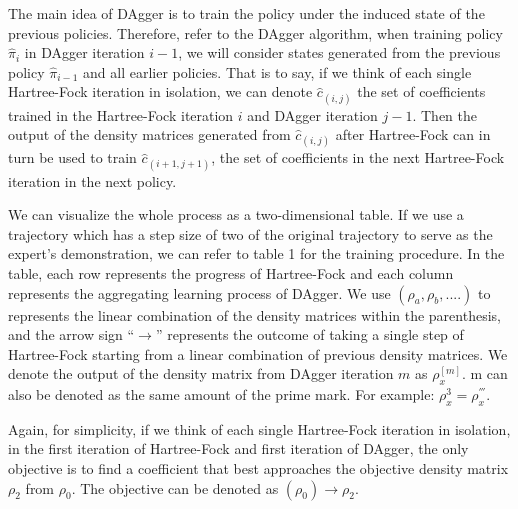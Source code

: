 \documentclass[twoside,11pt]{article}
\begin{document}


The main idea of DAgger is to train the policy under the induced state of the previous policies. Therefore, refer to the DAgger algorithm, when training policy $\hat{\pi}_{i}$ in DAgger iteration $i-1$,
we will consider states generated from the previous policy $\hat{\pi}_{i-1}$ and all earlier policies. That is to say, if we think of each single Hartree-Fock iteration in isolation, we can denote $\hat{c}_{(i,j)}$ the set of coefficients trained in the Hartree-Fock iteration $i$ and DAgger iteration $j-1$. Then the output of the density matrices generated from $\hat{c}_{(i,j)}$ after Hartree-Fock can in turn be used to train $\hat{c}_{(i+1,j+1)}$, the set of coefficients in the next Hartree-Fock iteration in the next policy.


We can visualize the whole process as a two-dimensional table. If we use a trajectory which has a step size of two of the original trajectory to serve as the expert's demonstration, we can refer to table 1 for the training procedure.
In the table, each row represents the progress of Hartree-Fock and each column represents the aggregating learning process of DAgger. We use $(\rho_a, \rho_b, ....)$ to represents the linear combination of the density matrices within the parenthesis, and the arrow sign ``$\rightarrow$'' represents the outcome of taking a single step of Hartree-Fock starting from a linear combination of previous density matrices. We denote the output of the density matrix from DAgger iteration $m$ as $\rho_x^{[m]}$. m can also be denoted as the same amount of the prime mark. For example: $\rho_x^{3} = \rho_x^{'''}$.

Again, for simplicity, if we think of each single Hartree-Fock iteration in isolation, in the first iteration of Hartree-Fock and first iteration of DAgger, the only objective is to find a coefficient that best approaches the objective density matrix $\rho_2$ from  $\rho_0$. The objective can be denoted as $(\rho_0) \rightarrow \rho_2$. 
\end{document}
